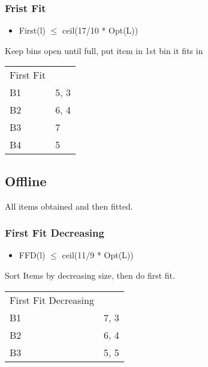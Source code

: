 \documentclass{article}
\begin{document}
\subsubsection{Frist Fit}
\label{sec:org80a971a}
\begin{itemize}
\item First(l) \(\leq\) ceil(17/10 * Opt(L))
\end{itemize}
Keep bins open until full, put item in 1st bin it fits in
\begin{center}
\begin{tabular}{ll}
First Fit & \\
B1 & 5, 3\\
B2 & 6, 4\\
B3 & 7\\
B4 & 5\\
\end{tabular}
\end{center}

\subsection{Offline}
\label{sec:org9925803}
All items obtained and then fitted.
\subsubsection{First Fit Decreasing}
\label{sec:org438d60c}
\begin{itemize}
\item FFD(l) \(\leq\) ceil(11/9 * Opt(L))
\end{itemize}
Sort Items by decreasing size, then do first fit.
\begin{center}
\begin{tabular}{ll}
First Fit Decreasing & \\
B1 & 7, 3\\
B2 & 6, 4\\
B3 & 5, 5\\
\end{tabular}
\end{center}
\end{document}
